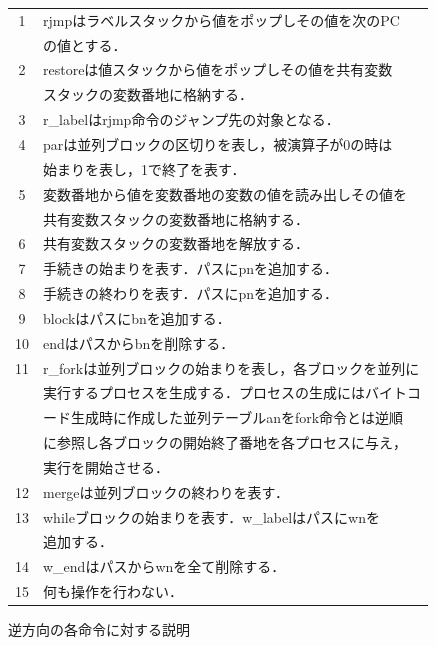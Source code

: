 \documentclass[submit,PRO]{ipsj}
\begin{document}
\begin{figure}[tb]
\caption{逆方向の各命令に対する説明}
\label{tab:expback}
\begin{center}
\begin{tabular}[t]{|c|l|}\hline
1 & rjmpはラベルスタックから値をポップしその値を次のPC\\ &の値とする．\\\hline

2 & restoreは値スタックから値をポップしその値を共有変数\\ &スタックの変数番地に格納する．\\\hline

3 & r\_labelはrjmp命令のジャンプ先の対象となる．\\\hline

4 & parは並列ブロックの区切りを表し，被演算子が0の時は\\ &始まりを表し，1で終了を表す．\\\hline

5 & 変数番地から値を変数番地の変数の値を読み出しその値を\\ &共有変数スタックの変数番地に格納する．\\\hline

6 & 共有変数スタックの変数番地を解放する．\\\hline

7 & 手続きの始まりを表す．パスにpnを追加する．\\\hline

8 & 手続きの終わりを表す．パスにpnを追加する．\\\hline

9 & blockはパスにbnを追加する．\\\hline

10 & endはパスからbnを削除する．\\\hline

11 & r\_forkは並列ブロックの始まりを表し，各ブロックを並列に\\ &実行するプロセスを生成する．プロセスの生成にはバイトコ\\ &ード生成時に作成した並列テーブルanをfork命令とは逆順\\ &に参照し各ブロックの開始終了番地を各プロセスに与え，\\ &実行を開始させる．\\\hline

12 & mergeは並列ブロックの終わりを表す．\\\hline

13 & whileブロックの始まりを表す．w\_labelはパスにwnを\\ &追加する．\\\hline

14 & w\_endはパスからwnを全て削除する．\\\hline

15 & 何も操作を行わない．\\\hline
\end{tabular}
\end{center}
\end{figure}
\end{document}
